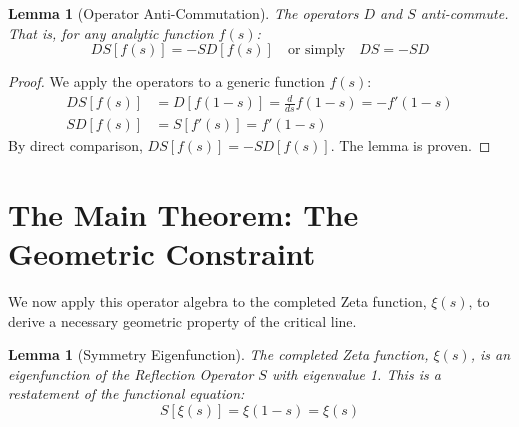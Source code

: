 \documentclass{article}
\newtheorem{lemma}[theorem]{Lemma}
\begin{document}
\begin{lemma}[Operator Anti-Commutation]
The operators $D$ and $S$ anti-commute. That is, for any analytic function $f(s)$:
$$ DS[f(s)] = -SD[f(s)] \quad \text{or simply} \quad DS = -SD $$
\end{lemma}
\begin{proof}
We apply the operators to a generic function $f(s)$:
\begin{align*}
    DS[f(s)] &= D[f(1-s)] = \frac{d}{ds}f(1-s) = -f'(1-s) \\
    SD[f(s)] &= S[f'(s)] = f'(1-s)
\end{align*}
By direct comparison, $DS[f(s)] = -SD[f(s)]$. The lemma is proven.
\end{proof}

\section{The Main Theorem: The Geometric Constraint}
We now apply this operator algebra to the completed Zeta function, $\xi(s)$, to derive a necessary geometric property of the critical line.

\begin{lemma}[Symmetry Eigenfunction]
The completed Zeta function, $\xi(s)$, is an eigenfunction of the Reflection Operator $S$ with eigenvalue 1. This is a restatement of the functional equation:
$$ S[\xi(s)] = \xi(1-s) = \xi(s) $$
\end{lemma}
\end{document}
